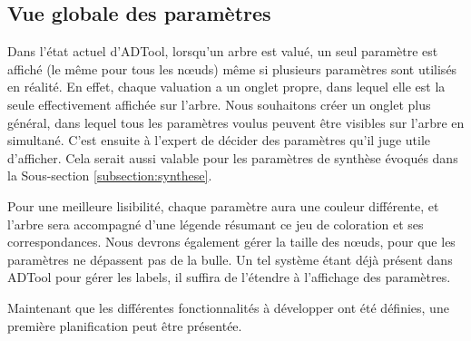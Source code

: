 	\subsection{Vue globale des paramètres}
		Dans l'état actuel d'ADTool, lorsqu'un arbre est valué, un seul paramètre est affiché (le même pour tous les nœuds) même si plusieurs paramètres sont utilisés en réalité. En effet, chaque valuation a un onglet propre, dans lequel elle est la seule effectivement affichée sur l'arbre. Nous souhaitons créer un onglet plus général, dans lequel tous les paramètres voulus peuvent être visibles sur l'arbre en simultané. C'est ensuite à l'expert de décider des paramètres qu'il juge utile d'afficher. Cela serait aussi valable pour les paramètres de synthèse évoqués dans la {\sc Sous-section} \ref{subsection:synthese}.
	
		Pour une meilleure lisibilité, chaque paramètre aura une couleur différente, et l'arbre sera accompagné d'une légende résumant ce jeu de coloration et ses correspondances. Nous devrons également gérer la taille des nœuds, pour que les paramètres ne dépassent pas de la bulle. Un tel système étant déjà présent dans ADTool pour gérer les labels, il suffira de l'étendre à l'affichage des paramètres.

		Maintenant que les différentes fonctionnalités à développer ont été définies, une première planification peut être présentée. 